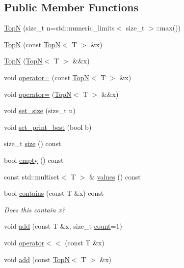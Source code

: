 \subsection*{Public Member Functions}
\begin{DoxyCompactItemize}
\item 
\hyperlink{class_top_n_a0ad4e5b78ff09e519ef1c5f361d4c6c0}{TopN} (size\+\_\+t n=std\+::numeric\+\_\+limits$<$ size\+\_\+t $>$\+::max())
\item 
\hyperlink{class_top_n_a8bd54bb09006a68c350a173eddc55549}{TopN} (const \hyperlink{class_top_n}{TopN}$<$ T $>$ \&x)
\item 
\hyperlink{class_top_n_ab7bccf0028a9a4972cd8d5ae4a555553}{TopN} (\hyperlink{class_top_n}{TopN}$<$ T $>$ \&\&x)
\item 
void \hyperlink{class_top_n_ac6afd8e83833aedc8690c3a0622d5535}{operator=} (const \hyperlink{class_top_n}{TopN}$<$ T $>$ \&x)
\item 
void \hyperlink{class_top_n_ae8dfc906735d0aa9774d9e6c17cc9d1c}{operator=} (\hyperlink{class_top_n}{TopN}$<$ T $>$ \&\&x)
\item 
void \hyperlink{class_top_n_a37c7506de12038af705c55fc479dba7b}{set\+\_\+size} (size\+\_\+t n)
\item 
void \hyperlink{class_top_n_a378be54915dab8603b8408ee72310bb7}{set\+\_\+print\+\_\+best} (bool b)
\item 
size\+\_\+t \hyperlink{class_top_n_ae32d3e10d1571af34f84f32f5ca78fff}{size} () const
\item 
bool \hyperlink{class_top_n_adb29d7b6490afe04adb88caac2f7fba0}{empty} () const
\item 
const std\+::multiset$<$ T $>$ \& \hyperlink{class_top_n_a50b05f8d4580c4652e8c1f6770943adc}{values} () const
\item 
bool \hyperlink{class_top_n_a2e948bc78d03a92abd1623ae8f8bd3d4}{contains} (const T \&x) const
\begin{DoxyCompactList}\small\item\em Does this contain x? \end{DoxyCompactList}\item 
void \hyperlink{class_top_n_a4fdddece51570832503747bf85d5ec19}{add} (const T \&x, size\+\_\+t \hyperlink{class_top_n_a8bfb8d5daa31a4fd95196cb41f0ac1ce}{count}=1)
\item 
void \hyperlink{class_top_n_a719a9b488e33a8266a25c594a8eb579d}{operator$<$$<$} (const T \&x)
\item 
void \hyperlink{class_top_n_a09be6a8873eef07ea3993e9fe7b6c71d}{add} (const \hyperlink{class_top_n}{TopN}$<$ T $>$ \&x)

\end{DoxyCompactItemize}

